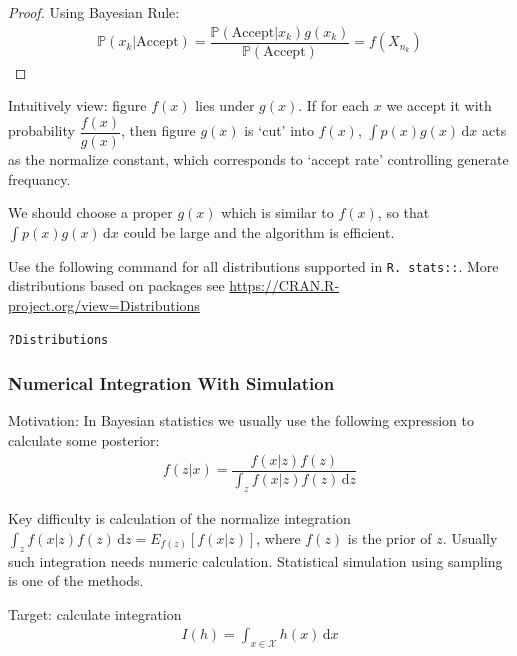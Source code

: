 \begin{itemize}[topsep=2pt,itemsep=0pt]
\begin{proof}
    Using Bayesian Rule:
    \begin{align}
        \mathbb{P}(x_k|\mathrm{Accept} )=\dfrac{\mathbb{P}(\mathrm{Accept}|x_k )g(x_k)}{\mathbb{P}(\mathrm{Accept} )}=f(X_{n_k}) 
    \end{align}
    \end{proof}

    Intuitively view: figure $ f(x) $ lies under $ g(x) $. If for each $ x $ we accept it with probability $ \dfrac{f(x)}{g(x)} $, then figure $ g(x) $ is `cut' into $ f(x) $, $ \int p(x)g(x) \,\mathrm{d}x $ acts as the normalize constant, which corresponds to `accept rate' controlling generate frequancy.

    We should choose a proper $ g(x) $ which is similar to $ f(x) $, so that $ \int p(x)g(x) \,\mathrm{d}x $ could be large and the algorithm is efficient.    
    
\end{itemize}

\begin{rcode}
    Use the following command for all distributions supported in \lstinline|R. stats::|. More distributions based on packages see \url{https://CRAN.R-project.org/view=Distributions}
\begin{lstlisting}[language=R]
?Distributions
\end{lstlisting}
\end{rcode}

\subsubsection{Numerical Integration With Simulation}   
    Motivation: In Bayesian statistics we usually use the following expression to calculate some posterior:
    \begin{align}
        f(z|x)=\dfrac{f(x|z)f(z)}{\displaystyle \int_z f(x|z)f(z) \,\mathrm{d}z} 
    \end{align}
    
    Key difficulty is calculation of the normalize integration $ \displaystyle \int_z f(x|z)f(z) \,\mathrm{d}z =E_{f(z)}[f(x|z)]$, where $ f(z) $ is the prior of $ z $. Usually such integration needs numeric calculation. Statistical simulation using sampling is one of the methods.

    Target: calculate integration
    \begin{align}
        I(h)=\int_{x\in \mathcal{X} } h(x) \,\mathrm{d}x 
    \end{align}
    
